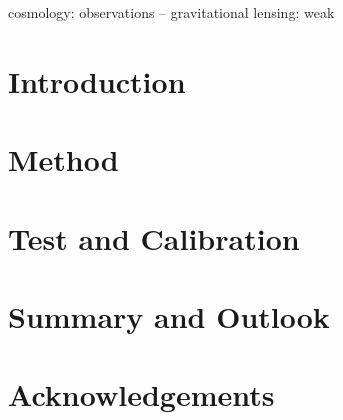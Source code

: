 \documentclass[a4paper,fleqn,usenatbib]{mnras}
\title[FPFS2}
\author[]{}
\begin{document}
\label{firstpage}
\pagerange{\pageref{firstpage}--\pageref{lastpage}}
\maketitle

\begin{abstract}
\end{abstract}


\begin{keywords}
cosmology: observations -- gravitational lensing: weak
\end{keywords}

\section{Introduction}
\label{sec:Intro}


\section{Method}
\label{sec:Method}

\section{Test and Calibration}
\label{sec:Test}


\section{Summary and Outlook}
\label{sec:End}


\section*{Acknowledgements}



\appendix

\bsp	%
\label{lastpage}
\end{document}
